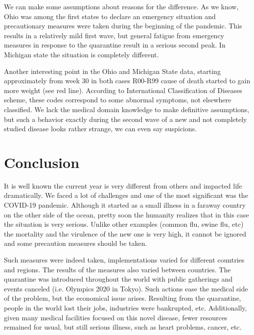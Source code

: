 \documentclass[conference]{IEEEtran}
\begin{document}
We can make some assumptions about reasons for the difference. As we know, Ohio was among the first states to declare an emergency situation and precautionary measures were taken during the beginning of the pandemic. This results in a relatively mild first wave, but general fatigue from emergency measures in response to the quarantine result in a serious second peak. In Michigan state the situation is completely different.

Another interesting point in the Ohio and Michigan State data, starting approximately from week 30 in both cases R00-R99 cause of death started to gain more weight (see red line). According to International Classification of Diseases scheme\cite{cdc_international_nodate}, these codes correspond to some abnormal symptoms, not elsewhere classified. We lack the medical domain knowledge to make definitive assumptions, but such a behavior exactly during the second wave of a new and not completely studied disease looks rather strange, we can even say suspicions.




\section{Conclusion}

It is well known the current year is very different from others and impacted life dramatically. We faced a lot of challenges and one of the most significant was the COVID-19 pandemic. Although it started as a small illness in a faraway country on the other side of the ocean, pretty soon the humanity realizes that in this case the situation is very serious. Unlike other examples (common flu, swine flu, etc) the mortality and the virulence of the new one is very high, it cannot be ignored and some precaution measures should be taken.

Such measures were indeed taken, implementations varied for different countries and regions. The results of the measures also varied between countries. The quarantine was introduced throughout the world with public gatherings and events canceled (i.e. Olympics 2020 in Tokyo). Such actions ease the medical side of the problem, but the economical issue arises. Resulting from the quarantine, people in the world lost their jobs, industries were bankrupted, etc. Additionally, given many medical facilities focused on this novel disease, fewer resources remained for usual, but still serious illness, such as heart problems, cancer, etc.
\end{document}
